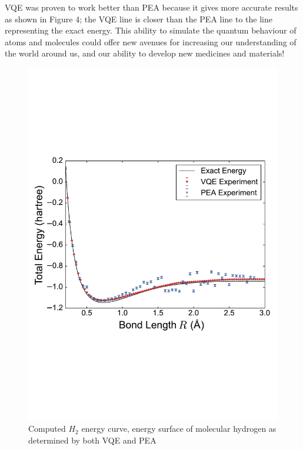 \documentclass[14pt,landscape,color=UCLdarkred,margin=3cm]{uclposter}
\begin{document}
\begin{multicols}{3}
VQE was proven to work better than PEA because it gives more accurate results as shown in Figure 4; the VQE line is closer than the PEA line to the line representing the exact energy. This ability to simulate the quantum behaviour of atoms and molecules could offer new avenues for increasing our understanding of the world around us, and our ability to develop new medicines and materials!

\begin{figure}[H]
  \begin{center}
  \includegraphics[scale=1.2]{result.pdf}
  \caption{Computed $H_2$ energy curve, energy surface of molecular hydrogen as determined by both VQE and PEA}
  \end{center}
    
 

   
\end{figure}



\end{multicols}
	
\end{document}
